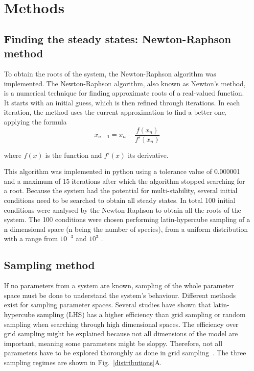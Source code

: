 \chapter{Methods}
\section{Finding the steady states: Newton-Raphson method}\label{newton_raphson}

To obtain the roots of the system, the Newton-Raphson algorithm was implemented.
The Newton-Raphson algorithm, also known as Newton's method, is a numerical technique for finding approximate roots of a real-valued function. It starts with an initial guess, which is then refined through iterations. In each iteration, the method uses the current approximation to find a better one, applying the formula
\begin{equation}
x_{n+1} = x_{n} - \frac{f(x_{n})}{f'(x_{n})}
\end{equation}

where $f(x)$ is the function and $f'(x)$ its derivative.

This algorithm was implemented in python using a tolerance value of 0.000001 and a maximum of 15 iterations after which the algorithm stopped searching for a root.
Because the system had the potential for multi-stability, several initial conditions need to be searched to obtain all steady states.
In total 100 initial conditions were analysed by the Newton-Raphson to obtain all the roots of the system.
The 100 conditions were chosen performing latin-hypercube sampling of a n dimensional space (n being the number of species), from a uniform distribution with a range from $10^{-3}$ and $10^3$ .
\section{Sampling method}\label{sampling method}
If no parameters from a system are known, sampling of the whole parameter space must be done to understand the system's behaviour.
Different methods exist for sampling parameter spaces.
Several studies have shown that latin-hypercube sampling (LHS) has a higher efficiency than grid sampling or random sampling when searching through high dimensional spaces.
The efficiency over grid sampling might be explained because not all dimensions of the model are important, meaning some parameters might be sloppy.
Therefore, not all parameters have to be explored thoroughly as done in grid sampling~\parencite{Iman2014, Bergstra2012}.
The three sampling regimes are shown in Fig.~\ref{distributions}A.

